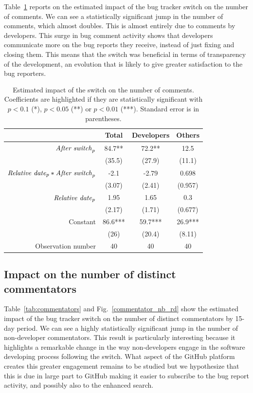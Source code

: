 \documentclass[runningheads]{llncs}
\begin{document}
Table~\ref{tab:comment_nb} reports on the estimated impact of the bug tracker switch on the number of comments. We can see a statistically significant jump in the number of comments, which almost doubles. This is almost entirely due to comments by developers. This surge in bug comment activity shows that developers communicate more on the bug reports they receive, instead of just fixing and closing them. This means that the switch was beneficial in terms of transparency of the development, an evolution that is likely to give greater satisfaction to the bug reporters.

\begin{table}
\centering
\caption{Estimated impact of the switch on the number of comments. Coefficients are highlighted if they are statistically significant with $p<0.1$ (*), $p<0.05$ (**) or $p<0.01$ (***). Standard error is in parentheses.}\label{tab:comment_nb}
\begin{tabular}{|r|c|c|c|}
\hline
&  Total & Developers & Others \\
\hline
$\mbox{\emph{After switch}}_p$ & 84.7** & 72.2** & 12.5 \\
& (35.5) & (27.9) & (11.1) \\
\hline
$\mbox{\emph{Relative date}}_p * \mbox{\emph{After switch}}_p$ & -2.1 & -2.79 & 0.698 \\
& (3.07) & (2.41) & (0.957) \\
\hline
$\mbox{\emph{Relative date}}_p$ & 1.95 & 1.65 & 0.3 \\
& (2.17) & (1.71) & (0.677) \\
\hline
Constant & 86.6*** & 59.7*** & 26.9*** \\
& (26) & (20.4) & (8.11) \\
\hline
Observation number & 40 & 40 & 40 \\
\hline
\end{tabular}
\end{table}

\subsection{Impact on the number of distinct commentators}

Table~\ref{tab:commentators} and Fig.~\ref{commentator_nb_rd} show the estimated impact of the bug tracker switch on the number of distinct commentators by 15-day period. We can see a highly statistically significant jump in the number of non-developer commentators. This result is particularly interesting because it highlights a remarkable change in the way non-developers engage in the software developing process following the switch. What aspect of the GitHub platform creates this greater engagement remains to be studied but we hypothesize that this is due in large part to GitHub making it easier to subscribe to the bug report activity, and possibly also to the enhanced search.
\end{document}

